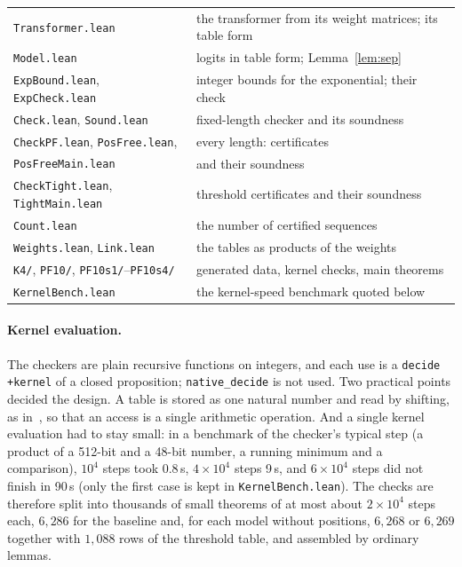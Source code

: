\documentclass[11pt,a4paper]{article}
\newcommand{\lean}[1]{\texttt{#1}}
\begin{document}
\begin{center}\small
\begin{tabular}{@{}p{}p{}@{}}
\toprule
\lean{Transformer.lean} & the transformer from its weight matrices; its table form\\
\lean{Model.lean} & logits in table form; Lemma~\ref{lem:sep}\\
\lean{ExpBound.lean}, \lean{ExpCheck.lean} & integer bounds for the exponential; their check\\
\lean{Check.lean}, \lean{Sound.lean} & fixed-length checker and its soundness\\
\lean{CheckPF.lean}, \lean{PosFree.lean}, & every length: certificates\\
\lean{PosFreeMain.lean} & and their soundness\\
\lean{CheckTight.lean}, \lean{TightMain.lean} & threshold certificates and their soundness\\
\lean{Count.lean} & the number of certified sequences\\
\lean{Weights.lean}, \lean{Link.lean} & the tables as products of the weights\\
\lean{K4/}, \lean{PF10/}, \lean{PF10s1/}--\lean{PF10s4/} & generated data, kernel checks, main theorems\\
\lean{KernelBench.lean} & the kernel-speed benchmark quoted below\\
\bottomrule
\end{tabular}
\end{center}

\paragraph{Kernel evaluation.}
The checkers are plain recursive functions on integers, and each use is a
\lean{decide +kernel} of a closed proposition; \lean{native\_decide} is not used.
Two practical points decided the design. A table is stored as one natural
number and read by shifting, as in~\cite{tealsea2026}, so that an access is a
single arithmetic operation. And a single kernel evaluation had to stay small:
in a benchmark of the checker's typical step (a product of a 512-bit and a
48-bit number, a running minimum and a comparison), $10^4$ steps took 0.8\,s,
$4\times10^4$ steps 9\,s, and $6\times10^4$ steps did not finish in 90\,s (only
the first case is kept in \lean{KernelBench.lean}). The checks are therefore
split into thousands of small theorems of at most about $2\times10^4$ steps
each, $6{,}286$ for the baseline and, for each model without positions,
$6{,}268$ or $6{,}269$ together with $1{,}088$ rows of the threshold table, and
assembled by ordinary lemmas.
\end{document}
